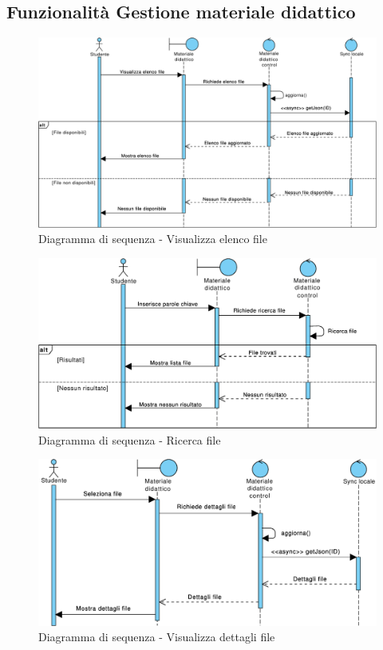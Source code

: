 \subsection{Funzionalità Gestione materiale didattico}

\begin{figure} [h]
	\centering
	\includegraphics[width=6.5in]{imgs/gruppo1/sequence_diagrams/SD13_visualizza_elenco_file.pdf}
	\caption{Diagramma di sequenza - Visualizza elenco file}
	\label{diag:visualizzaElencoFileSD}
\end{figure}

\begin{figure}
	\centering
	\includegraphics[width=6.5in]{imgs/gruppo1/sequence_diagrams/SD14_ricerca_file.pdf}
	\caption{Diagramma di sequenza - Ricerca file}
	\label{diag:ricercaFileSD}
\end{figure}
\newpage

\begin{figure}
	\centering
	\includegraphics[width=6.5in]{imgs/gruppo1//sequence_diagrams/SD15_visualizza_dettagli_file.pdf}
	\caption{Diagramma di sequenza - Visualizza dettagli file}
	\label{diag:visualizzaDettagliFileSD}
\end{figure}

